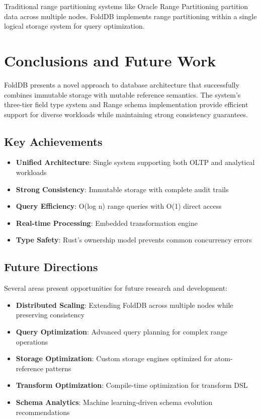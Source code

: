 \documentclass[11pt,a4paper]{article}
\begin{document}
Traditional range partitioning systems like Oracle Range Partitioning \cite{oracle2019partitioning} partition data across multiple nodes. FoldDB implements range partitioning within a single logical storage system for query optimization.

\section{Conclusions and Future Work}

FoldDB presents a novel approach to database architecture that successfully combines immutable storage with mutable reference semantics. The system's three-tier field type system and Range schema implementation provide efficient support for diverse workloads while maintaining strong consistency guarantees.

\subsection{Key Achievements}

\begin{itemize}
\item \textbf{Unified Architecture}: Single system supporting both OLTP and analytical workloads
\item \textbf{Strong Consistency}: Immutable storage with complete audit trails
\item \textbf{Query Efficiency}: O(log n) range queries with O(1) direct access
\item \textbf{Real-time Processing}: Embedded transformation engine
\item \textbf{Type Safety}: Rust's ownership model prevents common concurrency errors
\end{itemize}

\subsection{Future Directions}

Several areas present opportunities for future research and development:

\begin{itemize}
\item \textbf{Distributed Scaling}: Extending FoldDB across multiple nodes while preserving consistency
\item \textbf{Query Optimization}: Advanced query planning for complex range operations
\item \textbf{Storage Optimization}: Custom storage engines optimized for atom-reference patterns
\item \textbf{Transform Optimization}: Compile-time optimization for transform DSL
\item \textbf{Schema Analytics}: Machine learning-driven schema evolution recommendations
\end{itemize}
\end{document}
